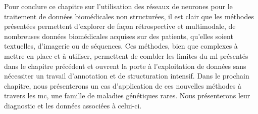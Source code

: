 Pour conclure ce chapitre sur l'utilisation des réseaux de neurones pour le traitement de données biomédicales non structurées, il est clair que les méthodes présentées permettent d’explorer de façon rétrospective et multimodale, de nombreuses données biomédicales acquises sur des patients, qu'elles soient textuelles,  d'imagerie ou de séquences. Ces méthodes, bien que complexes à mettre en place et à utiliser, permettent de combler les limites du \gls{ml} présentés dans le chapitre précédent et ouvrent la porte à l'exploitation de données sans nécessiter un travail d'annotation et de structuration intensif. Dans le prochain chapitre, nous présenterons un cas d'application de ces nouvelles méthodes à travers les \gls{mc}, une famille de maladies génétiques rares. Nous présenterons leur diagnostic et les données associées à celui-ci.
